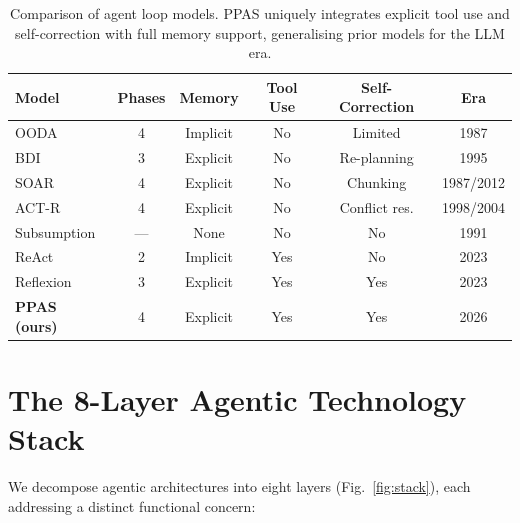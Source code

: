 \documentclass[review,authoryear]{elsarticle}
\theoremstyle{definition}
\begin{document}
\begin{table}[ht]
\centering
\caption{Comparison of agent loop models. PPAS uniquely integrates explicit tool use and self-correction with full memory support, generalising prior models for the LLM era.}
\label{tab:loop-comparison}
\begin{tabular}{lccccc}
\toprule
\textbf{Model} & \textbf{Phases} & \textbf{Memory} & \textbf{Tool Use} & \textbf{Self-Correction} & \textbf{Era} \\
\midrule
OODA \citep{boyd1987ooda}           & 4 & Implicit  & No  & Limited     & 1987 \\
BDI \citep{rao1995bdi}              & 3 & Explicit  & No  & Re-planning & 1995 \\
SOAR \citep{laird2012soar}          & 4 & Explicit  & No  & Chunking    & 1987/2012 \\
ACT-R \citep{anderson2004act}       & 4 & Explicit  & No  & Conflict res. & 1998/2004 \\
Subsumption \citep{brooks1991intelligence} & --- & None & No & No         & 1991 \\
ReAct \citep{yao2023react}          & 2 & Implicit  & Yes & No          & 2023 \\
Reflexion \citep{shinn2023reflexion} & 3 & Explicit & Yes & Yes         & 2023 \\
\textbf{PPAS (ours)}                 & 4 & Explicit  & Yes & Yes         & 2026 \\
\bottomrule
\end{tabular}
\end{table}

\section{The 8-Layer Agentic Technology Stack}\label{sec:stack}

We decompose agentic architectures into eight layers (Fig.~\ref{fig:stack}), each addressing a distinct functional concern:
\end{document}
